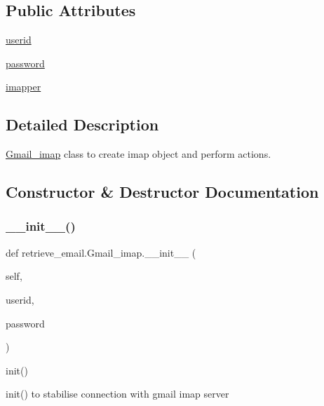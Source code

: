 \subsection*{Public Attributes}
\begin{DoxyCompactItemize}
\item 
\hyperlink{classretrieve__email_1_1Gmail__imap_a241e396e8bbcedd36d899dce1d7b4528}{userid}
\item 
\hyperlink{classretrieve__email_1_1Gmail__imap_a99bff913652cb1e676cb021ed54be41d}{password}
\item 
\hyperlink{classretrieve__email_1_1Gmail__imap_af49e03b664259409c814ea882586810c}{imapper}
\end{DoxyCompactItemize}


\subsection{Detailed Description}
\hyperlink{classretrieve__email_1_1Gmail__imap}{Gmail\+\_\+imap} class to create imap object and perform actions. 

\subsection{Constructor \& Destructor Documentation}
\mbox{\label{classretrieve__email_1_1Gmail__imap_ac61ba6b0ffcee2275f2a1063666449d0}} 
\subsubsection{\texorpdfstring{\+\_\+\+\_\+init\+\_\+\+\_\+()}{\_\_init\_\_()}}
{\footnotesize\ttfamily def retrieve\+\_\+email.\+Gmail\+\_\+imap.\+\_\+\+\_\+init\+\_\+\+\_\+ (\begin{DoxyParamCaption}\item[{}]{self,  }\item[{}]{userid,  }\item[{}]{password }\end{DoxyParamCaption})}



init() 

init() to stabilise connection with gmail imap server


